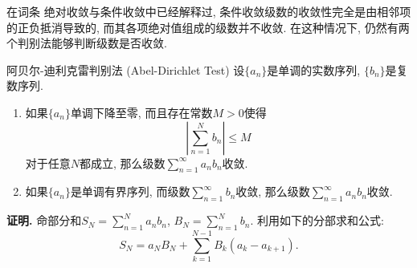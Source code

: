 

在词条 绝对收敛与条件收敛中已经解释过, 条件收敛级数的收敛性完全是由相邻项的正负抵消导致的, 而其各项绝对值组成的级数并不收敛. 在这种情况下, 仍然有两个判别法能够判断级数是否收敛.

\begin{theorem}{阿贝尔-迪利克雷判别法 (Abel-Dirichlet Test)}
设$\{a_n\}$是单调的实数序列, $\{b_n\}$是复数序列.

\begin{enumerate}
\item 如果$\{a_n\}$单调下降至零, 而且存在常数$M>0$使得
$$
\left|\sum_{n=1}^N b_n\right|\leq M
$$
对于任意$N$都成立, 那么级数$\sum_{n=1}^\infty a_nb_n$收敛.

\item 如果$\{a_n\}$是单调有界序列, 而级数$\sum_{n=1}^\infty b_n$收敛, 那么级数$\sum_{n=1}^\infty a_nb_n$收敛.
\end{enumerate}
\end{theorem}

\textbf{证明.} 命部分和$S_N=\sum_{n=1}^N a_nb_n$, $B_N=\sum_{n=1}^N b_n$. 利用如下的分部求和公式:
$$
S_N=a_NB_N+\sum_{k=1}^{N-1}B_k(a_{k}-a_{k+1}).
$$